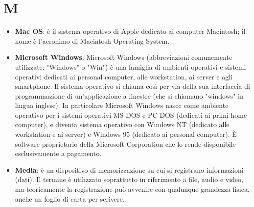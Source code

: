 \section{M}
\begin{itemize} 
	\item
	\textbf{Mac OS}: è il sistema operativo di Apple dedicato ai computer Macintosh; il nome è l'acronimo di Macintosh Operating System.
	\item
	\textbf{Microsoft Windows}: Microsoft Windows (abbreviazioni comunemente utilizzate: "Windows" o "Win") è una famiglia di ambienti operativi e sistemi operativi dedicati ai personal computer, alle workstation, ai server e agli smartphone. Il sistema operativo si chiama così per via della sua interfaccia di programmazione di un'applicazione a finestre (che si chiamano "windows" in lingua inglese).
	In particolare Microsoft Windows nasce come ambiente operativo per i sistemi operativi MS-DOS e PC DOS (dedicati ai primi home computer), e diventa sistema operativo con Windows NT (dedicato alle workstation e ai server) e Windows 95 (dedicato ai personal computer). È software proprietario della Microsoft Corporation che lo rende disponibile esclusivamente a pagamento. 
	\item
	\textbf{Media}: è un dispositivo di memorizzazione su cui si registrano informazioni (dati). Il termine è utilizzato soprattutto in riferimento a file, audio e video, ma teoricamente la registrazione può avvenire con qualunque grandezza fisica, anche un foglio di carta per scrivere.
\end{itemize}

